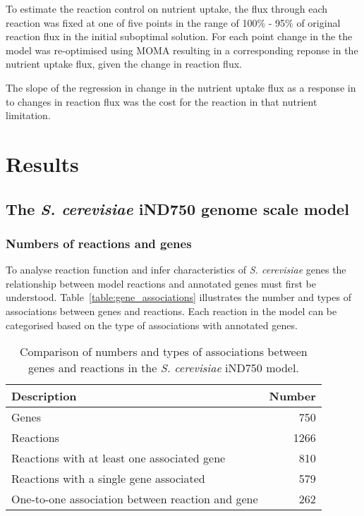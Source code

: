 To estimate the reaction control on nutrient uptake, the flux through each reaction was fixed at one of five points in the range of 100\% - 95\% of original reaction flux in the initial suboptimal solution. For each point change in the the model was re-optimised using MOMA resulting in a corresponding reponse in the nutrient uptake flux, given the change in reaction flux.

The slope of the regression in change in the nutrient uptake flux as a response in to changes in reaction flux was the cost for the reaction in that nutrient limitation.


\clearpage

\section{Results}%

\subsection{The \emph{S. cerevisiae} iND750 genome scale model}%

\subsubsection{Numbers of reactions and genes}%

To analyse reaction function and infer characteristics of \emph{S. cerevisiae} genes the relationship between model reactions and annotated genes must first be understood. Table~\vref{table:gene_associations} illustrates the number and types of associations between genes and reactions. Each reaction in the model can be categorised based on the type of associations with annotated genes.

\begin{table}[b]%
  \centering
  \begin{tabular}{l r}
                                                                   \toprule
    Description                                      & Number   \\ \midrule
    Genes                                            & 750      \\
    Reactions                                        & 1266     \\
    Reactions with at least one associated gene      & 810      \\
    Reactions with a single gene associated          & 579      \\
    One-to-one association between reaction and gene & 262      \\ \bottomrule
  \end{tabular}
  \caption[Gene associations in the \emph{S. cerevisiae} iND750 model]{Comparison of numbers and types of associations between genes and reactions in the \emph{S. cerevisiae} iND750 model. }
  \label{table:gene_associations}
\end{table}%

